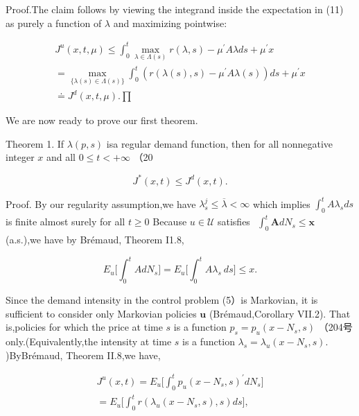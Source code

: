 Proof.The claim follows by viewing the integrand inside the expectation
in (11) as purely a function of \(\lambda\) and maximizing pointwise:

\[
\begin{array} { l } { \displaystyle { J ^ { u } ( x , t , \mu ) \leqslant \int _ { 0 } ^ { t } \underset { \lambda \in \Lambda ( s ) } { \operatorname* { m a x } } \left. r ( \lambda , s ) - \mu ^ { \prime } A \lambda \right. d s + \mu ^ { \prime } x } } \\ { \displaystyle { = \underset { \{ \lambda ( s ) \in \Lambda ( s ) \} } { \operatorname* { m a x } } \int _ { 0 } ^ { t } \left( r ( \lambda ( s ) , s ) - \mu ^ { \prime } A \lambda ( s ) \right) d s + \mu ^ { \prime } x } } \\ { \displaystyle { \doteq J ^ { d } ( x , t , \mu ) . } \prod } \end{array}
\]

We are now ready to prove our first theorem.

Theorem 1. If \(\lambda ( p , s )\) isa regular demand function, then
for all nonnegative integer \(x\) and all \(0 \leqslant t < + \infty\)
（20

\[
J ^ { * } ( x , t ) \leqslant J ^ { d } ( x , t ) .
\]

Proof. By our regularity assumption,we have
\(\lambda _ { s } ^ { j } \leqslant \overline { { \lambda } } < \infty\)
which implies \(\textstyle \int _ { 0 } ^ { t } A \lambda _ { s } d s\)
is finite almost surely for all \(t \geq 0\) Because
\(u \in \mathcal { U }\) satisfies
\(\begin{array} { r } { \int _ { 0 } ^ { t } \boldsymbol { A } d N _ { s } \leqslant \boldsymbol { x } } \end{array}\)
(a.s.),we have by Brémaud, Theorem I1.8,

\[
E _ { u } \Bigg [ \int _ { 0 } ^ { t } A d N _ { s } \Bigg ] = E _ { u } \Bigg [ \int _ { 0 } ^ { t } A \lambda _ { s } ~ d s \Bigg ] \leqslant x .
\]

Since the demand intensity in the control problem (5）is Markovian, it
is sufficient to consider only Markovian policies \(\boldsymbol { u }\)
(Brémaud,Corollary VII.2). That is,policies for which the price at time
\(s\) is a function \(p _ { s } = p _ { u } ( x - N _ { s } , s )\)
（204号 only.(Equivalently,the intensity at time \(s\) is a function
\(\lambda _ { s } = \lambda _ { u } ( x - N _ { s } , s ) .\)
)ByBrémaud, Theorem II.8,we have,

\[
\begin{array} { c } { { J ^ { u } ( x , t ) = E _ { u } \Bigg [ \displaystyle \int _ { 0 } ^ { t } p _ { u } ( x - N _ { s } , s ) ^ { \prime } d N _ { s } \Bigg ] } } \\ { { = E _ { u } \Bigg [ \displaystyle \int _ { 0 } ^ { t } r ( \lambda _ { u } ( x - N _ { s } , s ) , s ) d s \Bigg ] , } } \end{array}
\]

